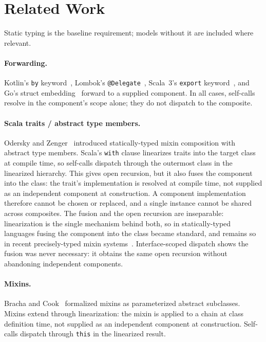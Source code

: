 \documentclass[sigplan,10pt,review,anonymous]{acmart}
\theoremstyle{acmplain}
\newcommand{\code}[1]{\texttt{#1}}
\begin{document}
\section{Related Work}
\label{sec:related}

Static typing is the baseline requirement; models without it are included where relevant.

\paragraph{Forwarding.}
Kotlin's \code{by} keyword~\cite{kotlin}, Lombok's \code{@Delegate}~\cite{lombok},
Scala~3's \code{export} keyword~\cite{scala3export}, and Go's struct
embedding~\cite{go} forward to a supplied component. In all cases, self-calls
resolve in the component's scope alone; they do not dispatch to the composite.

\paragraph{Scala traits / abstract type members.}
Odersky and Zenger~\cite{odersky2005} introduced statically-typed mixin
composition with abstract type members. Scala's \code{with} clause linearizes
traits into the target class at compile time, so self-calls dispatch through the
outermost class in the linearized hierarchy. This gives open recursion, but it
also fuses the component into the class: the trait's implementation is resolved
at compile time, not supplied as an independent component at construction. A component implementation therefore cannot be chosen or replaced, and
a single instance cannot be shared across composites. The fusion and the open recursion are inseparable: linearization is the single
mechanism behind both, so in statically-typed languages fusing the component
into the class became standard, and remains so in recent precisely-typed mixin
systems~\cite{fanparreaux2023}. Interface-scoped dispatch shows the fusion
was never necessary: it obtains the same open recursion without abandoning independent components.

\paragraph{Mixins.}
Bracha and Cook~\cite{bracha1990} formalized mixins as parameterized abstract
subclasses. Mixins extend through linearization: the mixin is applied to a chain at class
definition time, not supplied as an independent component at construction.
Self-calls dispatch through \code{this} in the linearized result.
\end{document}
